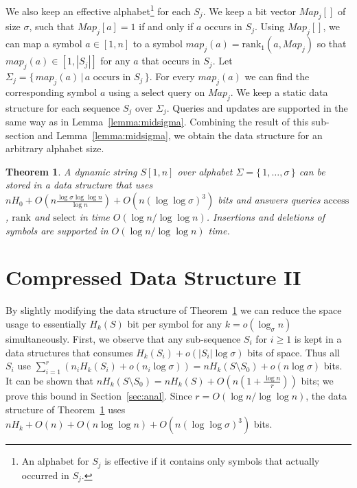 \documentclass[11pt]{article}\usepackage{fullpage}
\def\idrm#1{\ensuremath{\mathrm{#1}}}
\newtheorem{theorem}{Theorem}
\newcommand{\ra}{\idrm{rank}}
\newcommand{\sel}{\idrm{select}}
\newcommand{\acc}{\idrm{access}}
\begin{document}
We also keep an effective alphabet\footnote{An alphabet for $S_j$ is effective if it contains only symbols that actually occurred in $S_j$.} for each $S_j$. We keep 
a bit vector $Map_j[]$ of size $\sigma$, such that $Map_j[a]=1$ if and only if $a$ occurs in $S_j$. Using $Map_j[]$, we can map a symbol $a\in [1,n]$ to a symbol $map_j(a)=\ra_1(a,Map_j)$ 
so that $map_j(a)\in [1,|S_j|]$ for any $a$ that occurs in $S_j$. Let $\Sigma_j=\{\, map_j(a)\,|\, a\text{ occurs in }S_j\,\}$. For every $map_j(a)$ we can find the corresponding symbol $a$ 
using a $\sel$ query on $Map_j$. We keep a static data structure for each sequence $S_j$ over $\Sigma_j$.
Queries and updates are supported in the same way as in Lemma~\ref{lemma:midsigma}. Combining the result of this sub-section and Lemma~\ref{lemma:midsigma}, we obtain 
the data structure for an arbitrary alphabet size.
\begin{theorem}
  \label{theor:anysigma}
A dynamic string $S[1,n]$  over alphabet $\Sigma=\{\,1,\ldots,\sigma\,\}$ 
can be stored in a data structure that uses $nH_0 + O(n\frac{\log\sigma\log\log n}{\log n})+ O(n(\log\log \sigma)^3)$ bits and answers queries $\acc$, $\ra$ and $\sel$ in time $O(\log n/\log \log n)$.
Insertions and deletions of symbols are supported in $O(\log n /\log \log n)$ time. 
\end{theorem}


\section{Compressed Data Structure II}
\label{sec:compr2}
By slightly modifying the data structure of Theorem~\ref{theor:anysigma} we can reduce the space usage to essentially $H_k(S)$ bit per symbol for any $k=o(\log_{\sigma}n)$  simultaneously. First, we observe that any sub-sequence $S_i$ for $i\ge 1$ is kept in a data structures that consumes $H_k(S_i)+o(|S_i|\log \sigma)$ bits of space. Thus all $S_i$ use $\sum_{i=1}^r(n_iH_k(S_i)+o(n_i\log\sigma))=nH_k(S\setminus S_0)+o(n\log\sigma)$ bits.  It can be shown that 
$nH_k(S\setminus S_0)=nH_k(S)+O(n (1+\frac{\log n}{r}))$ bits; we prove this bound in Section~\ref{sec:anal}.  Since $r=O(\log n/\log\log n)$, the data structure of Theorem~\ref{theor:anysigma} uses $nH_k + O(n) +O(n\log\log n)+O(n(\log\log \sigma)^3)$ bits. 
\end{document}
